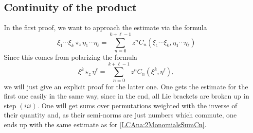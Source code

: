 \subsection{Continuity of the product}
In the first proof, we want to approach the estimate via the formula
\begin{equation*}
    \xi_1 \cdots \xi_k \star_z \eta_1 \cdots \eta_{\ell}
    =
    \sum\limits_{n=0}^{k + \ell -1}
    z^n
    C_n (\xi_1 \cdots \xi_k, \eta_1 \cdots \eta_{\ell})
\end{equation*}
Since this comes from polarizing the formula
\begin{equation}
    \label{LCAna:2MonomialsSumCn}
    \xi^k \star_z \eta^{\ell}
    =
    \sum\limits_{n=0}^{k + \ell -1}
    z^n
    C_n \left( \xi^k, \eta^{\ell} \right),
\end{equation}
we will just give an explicit proof for the latter one. One gets the
estimate for the first one easily in the same way, since in the end,
all Lie brackets are broken up in step $(iii)$. One will get 
sums over permutations weighted with the inverse of their quantity and, as 
their semi-norms are just numbers which commute, one ends up with the same 
estimate as for \eqref{LCAna:2MonomialsSumCn}. 

